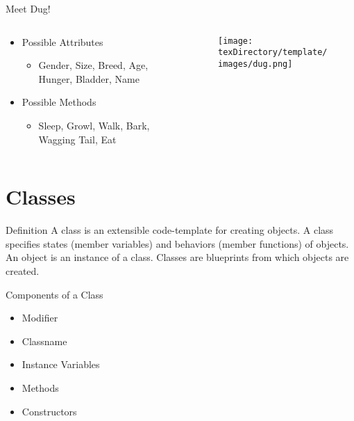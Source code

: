 \documentclass[10pt, compress]{beamer}
\begin{document}
\begin{slide}
	\begin{block}{Meet Dug!}
		\begin{columns}
			\begin{column}{0.5\textwidth}
				\begin{itemize}
					\item[] {Possible Attributes}
						\begin{itemize}
							\item[] Gender, Size, Breed, Age, Hunger, Bladder, Name
						\end{itemize}
					\item[] Possible Methods
						\begin{itemize}
							\item[] Sleep, Growl, Walk, Bark, Wagging Tail, Eat
						\end{itemize}
				\end{itemize}
			\end{column}
			\begin{column}{0.5\textwidth}
				\begin{figure}[H]\centering
					\texttt{[image: \\texDirectory/template/images/dug.png]}
				\end{figure}
			\end{column}
		\end{columns}
	\end{block}
\end{slide}

\section{Classes}

\begin{slide}
	\begin{block}{Definition}
		A class is an extensible code-template for creating objects.
		A class specifies states (member variables) and behaviors (member functions) of objects.
		An object is an instance of a class.
		Classes are blueprints from which objects are created.
	\end{block}
\end{slide}

\begin{slide}
	\begin{block}{Components of a Class}
		\begin{itemize}
			\item[] Modifier
			\item[] Classname
			\item[] Instance Variables
			\item[] Methods
			\item[] Constructors
		\end{itemize}
	\end{block}
\end{slide}
\end{document}
